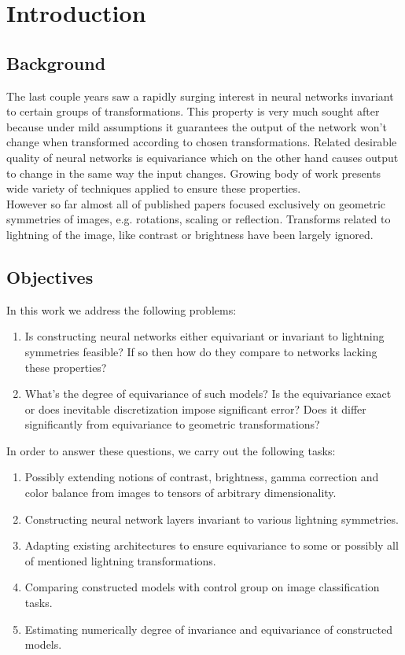 \section{Introduction}
\subsection{Background}
The last couple  years saw a rapidly surging interest in neural networks
invariant to certain groups of transformations. This property
is very much sought after because under mild assumptions it
guarantees the output of the network won't change when transformed according to
chosen
transformations. Related desirable quality of neural networks is equivariance
which on the other hand causes output to change in the same way the input
changes. Growing body of work presents wide variety of
techniques applied to ensure these properties.
\\ However so far almost all of published papers focused exclusively on
geometric symmetries of images, e.g. rotations, scaling or reflection. Transforms
related to lightning of the image, like contrast or brightness have been largely
ignored.
\subsection{Objectives}
In this work we address the following problems:
\begin{enumerate}
    \item Is constructing neural networks either equivariant or invariant to
        lightning symmetries feasible? If so then how do they compare to networks
        lacking these properties?
    \item What's the degree of equivariance of such models? Is the equivariance
        exact or does inevitable discretization impose significant error?
        Does it differ significantly from equivariance to geometric
        transformations? 
\end{enumerate}
In order to answer these questions, we carry out the following tasks:
\begin{enumerate}
    \item Possibly extending notions of contrast, brightness, gamma correction 
        and color balance from
        images to tensors of arbitrary dimensionality.
    \item Constructing neural network layers invariant to various lightning
        symmetries.
    \item Adapting existing architectures to ensure equivariance to some or
        possibly all of mentioned lightning transformations.
    \item Comparing constructed models with control group on image
        classification tasks.
    \item Estimating numerically degree of invariance and equivariance of constructed models.
\end{enumerate}
